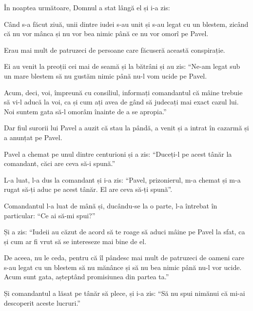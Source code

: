 {\par }{\PP {}În noaptea următoare, Domnul a stat lângă el și i-a zis:
{}


\par }{\PP {}Când s-a făcut ziuă, unii dintre iudei s-au unit și s-au legat cu un blestem, zicând că nu vor mânca și nu vor bea nimic până ce nu vor omorî pe Pavel.

Erau mai mult de patruzeci de persoane care făcuseră această conspirație.

Ei au venit la preoții cei mai de seamă și la bătrâni și au zis: “Ne-am legat sub un mare blestem să nu gustăm nimic până nu-l vom ucide pe Pavel.

Acum, deci, voi, împreună cu consiliul, informați comandantul că mâine trebuie să vi-l aducă la voi, ca și cum ați avea de gând să judecați mai exact cazul lui. Noi suntem gata să-l omorâm înainte de a se apropia.”


\par }{\PP {}Dar fiul surorii lui Pavel a auzit că stau la pândă, a venit și a intrat în cazarmă și a anunțat pe Pavel.

Pavel a chemat pe unul dintre centurioni și a zis: “Duceți-l pe acest tânăr la comandant, căci are ceva să-i spună.”


\par }{\PP {}L-a luat, l-a dus la comandant și i-a zis: “Pavel, prizonierul, m-a chemat și m-a rugat să-ți aduc pe acest tânăr. El are ceva să-ți spună”.


\par }{\PP {}Comandantul l-a luat de mână și, ducându-se la o parte, l-a întrebat în particular: “Ce ai să-mi spui?”


\par }{\PP {}Și a zis: “Iudeii au căzut de acord să te roage să aduci mâine pe Pavel la sfat, ca și cum ar fi vrut să se intereseze mai bine de el.

De aceea, nu le ceda, pentru că îl pândesc mai mult de patruzeci de oameni care s-au legat cu un blestem să nu mănânce și să nu bea nimic până nu-l vor ucide. Acum sunt gata, așteptând promisiunea din partea ta.”


\par }{\PP {}Și comandantul a lăsat pe tânăr să plece, și i-a zis: “Să nu spui nimănui că mi-ai descoperit aceste lucruri.”


}
